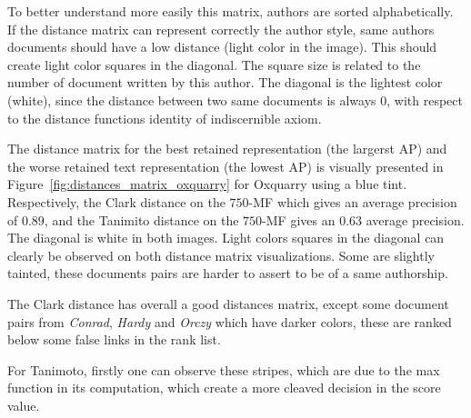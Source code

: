 To better understand more easily this matrix, authors are sorted alphabetically.
If the distance matrix can represent correctly the author style, same authors documents should have a low distance (light color in the image).
This should create light color squares in the diagonal.
The square size is related to the number of document written by this author.
The diagonal is the lightest color (white), since the distance between two same documents is always 0, with respect to the distance functions identity of indiscernible axiom.

The distance matrix for the best retained representation (the largerst AP) and the worse retained text representation (the lowest AP) is visually presented in Figure~\ref{fig:distances_matrix_oxquarry} for Oxquarry using a blue tint.
Respectively, the Clark distance on the $750$-MF which gives an average precision of $0.89$, and the Tanimito distance on the $750$-MF gives an $0.63$ average precision.
The diagonal is white in both images.
Light colors squares in the diagonal can clearly be observed on both distance matrix visualizations.
Some are slightly tainted, these documents pairs are harder to assert to be of a same authorship.

The Clark distance has overall a good distances matrix, except some document pairs from \textit{Conrad}, \textit{Hardy} and \textit{Orczy} which have darker colors, these are ranked below some false links in the rank list.

For Tanimoto, firstly one can observe these stripes, which are due to the max function in its computation, which create a more cleaved decision in the score value.

